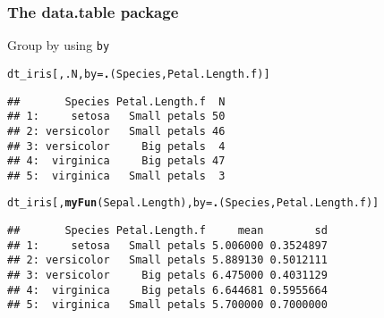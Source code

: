 \documentclass[paper=screen,mathserif]{beamer}\usepackage[]{graphicx}\usepackage[]{color}
\makeatletter
\newcommand{\hlstd}[1]{\textcolor[rgb]{0.345,0.345,0.345}{#1}}%
\newcommand{\hlkwc}[1]{\textcolor[rgb]{0.333,0.667,0.333}{#1}}%
\newcommand{\hlkwd}[1]{\textcolor[rgb]{0.737,0.353,0.396}{\textbf{#1}}}%
\newenvironment{kframe}{%
 \def\at@end@of@kframe{}%
 \ifinner\ifhmode%
  \def\at@end@of@kframe{\end{minipage}}%
  \begin{minipage}{\columnwidth}%
 \fi\fi%
 \def\FrameCommand##1{\hskip\@totalleftmargin \hskip-\fboxsep
 \colorbox{shadecolor}{##1}\hskip-\fboxsep
     \hskip-\linewidth \hskip-\@totalleftmargin \hskip\columnwidth}%
 \MakeFramed {\advance\hsize-\width
   \@totalleftmargin\z@ \linewidth\hsize
   \@setminipage}}%
 {\par\unskip\endMakeFramed%
 \at@end@of@kframe}
\newenvironment{knitrout}{}{} %
\newcommand{\ft}[1]{\frametitle{#1}}
\makeatother
\begin{document}
\begin{frame}[fragile]
  \ft{The {\bf data.table} package}
  
  Group by using {\tt by}
\begin{knitrout}\scriptsize
{}\color{fgcolor}\begin{kframe}
\begin{alltt}
\hlstd{dt_iris[, .N,} \hlkwc{by} \hlstd{=} \hlkwd{.}\hlstd{(Species, Petal.Length.f)]}
\end{alltt}
\begin{verbatim}
##       Species Petal.Length.f  N
## 1:     setosa   Small petals 50
## 2: versicolor   Small petals 46
## 3: versicolor     Big petals  4
## 4:  virginica     Big petals 47
## 5:  virginica   Small petals  3
\end{verbatim}
\begin{alltt}
\hlstd{dt_iris[,} \hlkwd{myFun}\hlstd{(Sepal.Length),} \hlkwc{by} \hlstd{=} \hlkwd{.}\hlstd{(Species, Petal.Length.f)]}
\end{alltt}
\begin{verbatim}
##       Species Petal.Length.f     mean        sd
## 1:     setosa   Small petals 5.006000 0.3524897
## 2: versicolor   Small petals 5.889130 0.5012111
## 3: versicolor     Big petals 6.475000 0.4031129
## 4:  virginica     Big petals 6.644681 0.5955664
## 5:  virginica   Small petals 5.700000 0.7000000
\end{verbatim}
\end{kframe}
\end{knitrout}

\end{frame}
\end{document}

